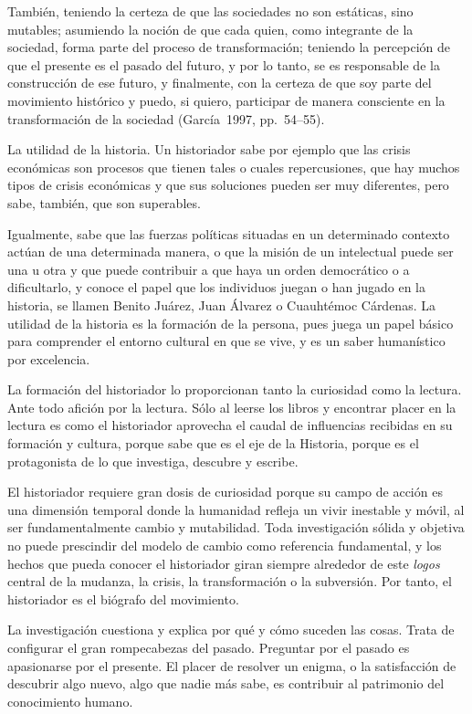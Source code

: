  
También, teniendo la certeza de que las sociedades no son estáticas, 
sino mutables; asumiendo la noción de que cada quien, como integrante 
de la sociedad, forma parte del proceso de transformación; teniendo la 
percepción de que el presente es el pasado del futuro, y por lo tanto, 
se es responsable de la construcción de ese futuro, y finalmente, con 
la certeza de que soy parte del movimiento histórico y puedo, si 
quiero, participar de manera consciente en la transformación de la 
sociedad (García~1997, pp.~54--55).

 
La utilidad de la historia. Un historiador sabe por ejemplo que las 
crisis económicas son procesos que tienen tales o cuales repercusiones, 
que hay muchos tipos de crisis económicas y que sus soluciones pueden 
ser muy diferentes, pero sabe, también, que son superables. 

 
Igualmente, sabe que las fuerzas políticas situadas en un determinado 
contexto actúan de una determinada manera, o que la misión de un 
intelectual puede ser una u otra y que puede contribuir a que haya un 
orden democrático o a dificultarlo, y conoce el papel que los 
individuos juegan o han jugado en la historia, se llamen Benito 
Juárez, Juan Álvarez o Cuauhtémoc Cárdenas. La utilidad de la historia 
es la formación de la persona, pues juega un papel básico para 
comprender el entorno cultural en que se vive, y es un saber 
humanístico por excelencia.

 
La formación del historiador lo proporcionan tanto la curiosidad como 
la lectura. Ante todo afición por la lectura.  Sólo al leerse los 
libros y encontrar placer en la lectura es como el historiador  
aprovecha el caudal de influencias recibidas en su formación y cultura, 
porque sabe que es el eje de la Historia, porque es el protagonista de 
lo que investiga, descubre y escribe.

 
El historiador requiere gran dosis de curiosidad porque su campo de 
acción es una dimensión temporal donde la humanidad refleja un vivir 
inestable y móvil, al ser fundamentalmente cambio y mutabilidad. Toda 
investigación sólida y objetiva no puede prescindir del modelo de 
cambio como referencia fundamental, y los hechos que pueda conocer el 
historiador giran siempre alrededor de este \textit{logos} central de 
la mudanza, la crisis, la transformación o la subversión. Por tanto, el 
historiador es el biógrafo del movimiento.

 
La investigación cuestiona y explica por qué y cómo suceden las cosas. 
Trata de configurar el gran rompecabezas del pasado. Preguntar por el 
pasado es apasionarse por el presente. El placer de resolver un enigma, 
o la satisfacción de descubrir algo nuevo, algo que nadie más sabe, es 
contribuir al patrimonio del conocimiento humano.

